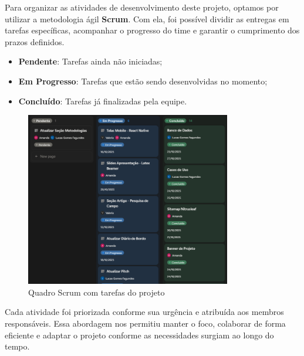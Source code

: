 Para organizar as atividades de desenvolvimento deste projeto, optamos por utilizar
a metodologia ágil \textbf{Scrum}. Com ela, foi possível dividir as entregas em tarefas
específicas, acompanhar o progresso do time e garantir o cumprimento dos prazos
definidos.
\medskip


\begin{itemize}[itemsep=0.6em, topsep=0.3em, parsep=0pt]
    \item \textbf{Pendente}:  Tarefas ainda não iniciadas;
    \item \textbf{Em Progresso}: Tarefas que estão sendo desenvolvidas no momento;
    \item \textbf{Concluído}: Tarefas já finalizadas pela equipe.
\end{itemize}
\medskip

\begin{figure}[H]
\centering
\caption{Quadro Scrum com tarefas do projeto}%
\label{fig:quadro-scrum}
\includegraphics[width=0.8\textwidth]{Images/Scrum.png}
\end{figure}
\medskip

Cada atividade foi priorizada conforme sua urgência e atribuída aos membros
responsáveis. Essa abordagem nos permitiu manter o foco, colaborar de forma
eficiente e adaptar o projeto conforme as necessidades surgiam ao longo do tempo.
